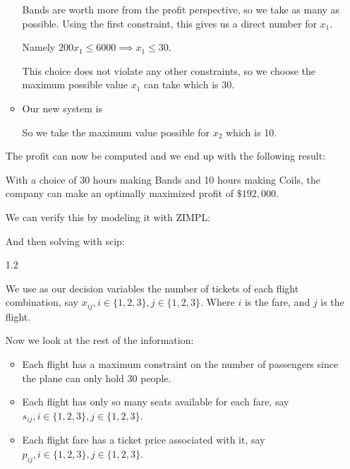 \documentclass[12pt,letterpaper]{article}
\begin{document}
\begin{enumerate}
\begin{itemize}
          Bands are worth more from the profit perspective, so we take as many as possible.
          Using the first constraint, this gives us a direct number for $x_1$.

          Namely $200 x_1 \leq 6000 \implies x_1 \leq 30$.

          This choice does not violate any other constraints,
          so we choose the maximum possible value $x_1$ can take which is 30.

        \item
          Our new system is


          So we take the maximum value possible for $x_2$ which is 10.
      \end{itemize}

      The profit can now be computed and we end up with the following result:

      With a choice of 30 hours making Bands and 10 hours making Coils,
      the company can make an optimally maximized profit of $\$192,000$.

      We can verify this by modeling it with ZIMPL:

      

      And then solving with scip:

      

    \item [1.2]

      We use as our decision variables the number of tickets of each flight combination,
      say $x_{ij}, i \in \{1, 2, 3\}, j \in \{1, 2, 3\}$.
      Where $i$ is the fare, and $j$ is the flight.

      Now we look at the rest of the information:

      \begin{itemize}
        \item
          Each flight has a maximum constraint on the number of passengers since the plane can only hold 30 people.

        \item
          Each flight has only so many seats available for each fare,
          say $s_{ij}, i \in \{1, 2, 3\}, j \in \{1, 2, 3\}$.

        \item
          Each flight fare has a ticket price associated with it,
          say $p_{ij}, i \in \{1, 2, 3\}, j \in \{1, 2, 3\}$.


\end{itemize}
\end{enumerate}
\end{document}
